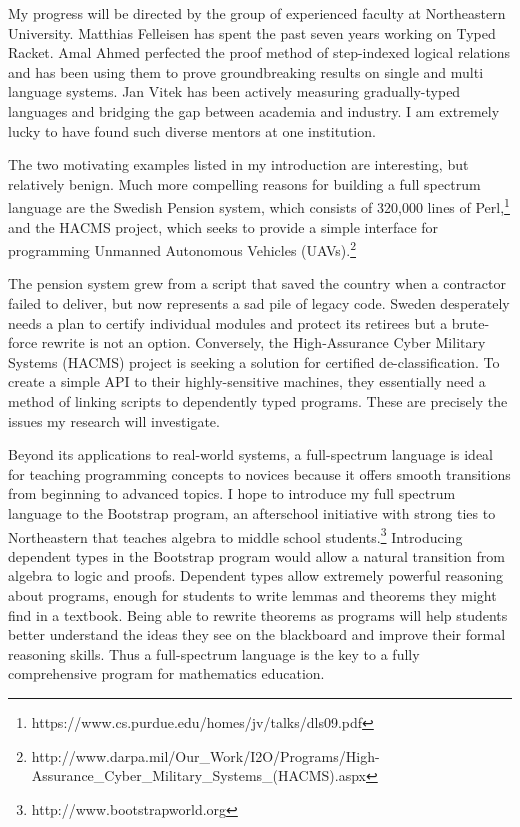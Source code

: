 \documentclass[12pt]{article}
\newcommand{\hdr}[2]{\vspace{-0.4cm}{\flushleft{\hrulefill\\\textbf{#1}\hfill{#2}\\\vspace{-0.2cm}\hrulefill}}\vspace{0.1cm}}
\begin{document}
My progress will be directed by the group of experienced faculty at Northeastern University.
Matthias Felleisen has spent the past seven years working on Typed Racket.
Amal Ahmed perfected the proof method of step-indexed logical relations and has been using them to prove groundbreaking results on single and multi language systems.
Jan Vitek has been actively measuring gradually-typed languages and bridging the gap between academia and industry.
I am extremely lucky to have found such diverse mentors at one institution.

\newpage

\hdr{Broader Impacts}{}

The two motivating examples listed in my introduction are interesting, but relatively benign.
Much more compelling reasons for building a full spectrum language are the Swedish Pension system, which consists of 320,000 lines of Perl,\footnote{https://www.cs.purdue.edu/homes/jv/talks/dls09.pdf} and the HACMS project, which seeks to provide a simple interface for programming Unmanned Autonomous Vehicles (UAVs).\footnote{http://www.darpa.mil/Our\_Work/I2O/Programs/High-Assurance\_Cyber\_Military\_Systems\_(HACMS).aspx}

The pension system grew from a script that saved the country when a contractor failed to deliver, but now represents a sad pile of legacy code.
Sweden desperately needs a plan to certify individual modules and protect its retirees but a brute-force rewrite is not an option.
Conversely, the High-Assurance Cyber Military Systems (HACMS) project is seeking a solution for certified de-classification.
To create a simple API to their highly-sensitive machines, they essentially need a method of linking scripts to dependently typed programs.
These are precisely the issues my research will investigate.

Beyond its applications to real-world systems, a full-spectrum language is ideal for teaching programming concepts to novices because it offers smooth transitions from beginning to advanced topics.
I hope to introduce my full spectrum language to the Bootstrap program, an afterschool initiative with strong ties to Northeastern that teaches algebra to middle school students.\footnote{http://www.bootstrapworld.org}
Introducing dependent types in the Bootstrap program would allow a natural transition from algebra to logic and proofs.
Dependent types allow extremely powerful reasoning about programs, enough for students to write lemmas and theorems they might find in a textbook.
Being able to rewrite theorems as programs will help students better understand the ideas they see on the blackboard and improve their formal reasoning skills.
Thus a full-spectrum language is the key to a fully comprehensive program for mathematics education.

\vfill{}
\renewcommand{\section}[2]{}
\begin{multicols}{2}
\footnotesize


\end{multicols}
\end{document}
